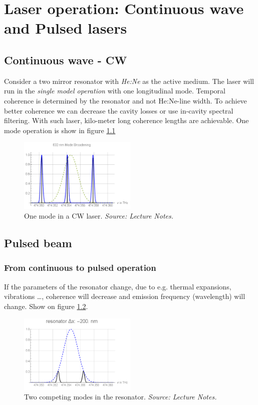 \chapter{Laser operation: Continuous wave and Pulsed lasers}
\section{Continuous wave  - CW}
Consider a two mirror resonator with \textit{He:Ne} as the active medium.
The laser will run in the \textit{single model operation} with one longitudinal mode. Temporal coherence is determined by the 
resonator and not He:Ne-line width. To achieve better coherence we can decrease the cavity losses or use in-cavity spectral filtering. 
With such laser, kilo-meter long coherence lengths are achievable. One mode operation is show in figure \ref{fig:omcw}
\begin{figure}[h!]
    \centering
    \includegraphics[width=0.5\textwidth]{slike/cw.png}
    \caption{One mode in a CW laser. \textit{Source: Lecture Notes.}}
    \label{fig:omcw}
\end{figure}

\section{Pulsed beam}
\subsection{From continuous to pulsed operation}
If the parameters of the resonator change, due to e.g. thermal expansions, vibrations \dots ,
coherence will decrease and emission frequency (wavelength) will change. Show on figure \ref{fig:hene2modes}.
\begin{figure}[h!]
    \centering
    \includegraphics[width=0.5\textwidth]{slike/hene2modes.png}
    \caption{Two competing modes in the resonator. \textit{Source: Lecture Notes.}}
    \label{fig:hene2modes}
\end{figure}

